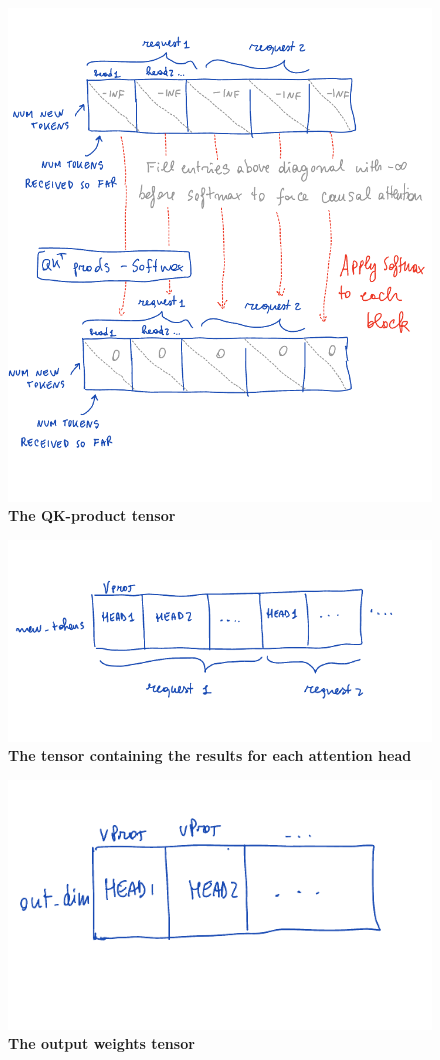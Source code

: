 \begin{figure}[H]
    \centering
    \includegraphics[width=\linewidth]{figures/qk_prods.png}
    \caption{\textbf{The QK-product tensor}}
    \label{fig:mha-qk-products}
\end{figure}

\begin{figure}[H]
    \centering
    \includegraphics[width=0.6\linewidth]{figures/attn_heads.png}
    \caption{\textbf{The tensor containing the results for each attention head}}
    \label{fig:mha-attn-head}
\end{figure}

\begin{figure}[H]
    \centering
    \includegraphics[width=0.6\linewidth]{figures/w_out-contiguous.png}
    \caption{\textbf{The output weights tensor}}
    \label{fig:w-out}
\end{figure}
